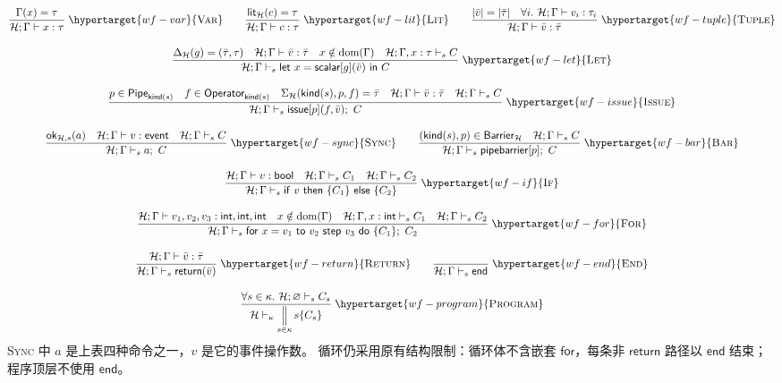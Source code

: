 \documentclass[UTF8,a4paper,11pt,fontset=fandol]{ctexart}
\newcommand{\kw}[1]{\ensuremath{\mathsf{#1}}}
\newcommand{\infer}[2]{\displaystyle\frac{\displaystyle #1}{\displaystyle #2}}
\begin{document}
\begin{equation*}
\begin{gathered}
\infer{\Gamma(x)=\tau}{\mathcal H;\Gamma\vdash x:\tau}\;\hypertarget{wf-var}{\textsc{Var}}
\qquad
\infer{\mathsf{lit}_{\mathcal H}(c)=\tau}{\mathcal H;\Gamma\vdash c:\tau}\;\hypertarget{wf-lit}{\textsc{Lit}}
\qquad
\infer{|\bar v|=|\bar\tau|\quad\forall i.\ \mathcal H;\Gamma\vdash v_i:\tau_i}
 {\mathcal H;\Gamma\vdash\bar v:\bar\tau}\;\hypertarget{wf-tuple}{\textsc{Tuple}}\\[1em]
\infer{\Delta_{\mathcal H}(g)=(\bar\tau,\tau)\quad\mathcal H;\Gamma\vdash\bar v:\bar\tau\quad
 x\notin\mathrm{dom}(\Gamma)\quad\mathcal H;\Gamma,x:\tau\vdash_s C}
 {\mathcal H;\Gamma\vdash_s\kw{let}\ x=\kw{scalar}[g](\bar v)\ \kw{in}\ C}
 \;\hypertarget{wf-let}{\textsc{Let}}\\[1em]
\infer{p\in\mathsf{Pipe}_{\mathsf{kind}(s)}\quad f\in\mathsf{Operator}_{\mathsf{kind}(s)}\quad
 \Sigma_{\mathcal H}(\mathsf{kind}(s),p,f)=\bar\tau\quad\mathcal H;\Gamma\vdash\bar v:\bar\tau\quad\mathcal H;\Gamma\vdash_s C}
 {\mathcal H;\Gamma\vdash_s\kw{issue}[p](f,\bar v);\ C}
 \;\hypertarget{wf-issue}{\textsc{Issue}}\\[1em]
\infer{\mathsf{ok}_{\mathcal H,s}(a)\quad\mathcal H;\Gamma\vdash v:\mathsf{event}\quad\mathcal H;\Gamma\vdash_s C}
 {\mathcal H;\Gamma\vdash_s a;\ C}\;\hypertarget{wf-sync}{\textsc{Sync}}
\qquad
\infer{(\mathsf{kind}(s),p)\in\mathsf{Barrier}_{\mathcal H}\quad\mathcal H;\Gamma\vdash_s C}
 {\mathcal H;\Gamma\vdash_s\kw{pipebarrier}[p];\ C}\;\hypertarget{wf-bar}{\textsc{Bar}}\\[1em]
\infer{\mathcal H;\Gamma\vdash v:\mathsf{bool}\quad\mathcal H;\Gamma\vdash_s C_1\quad\mathcal H;\Gamma\vdash_s C_2}
 {\mathcal H;\Gamma\vdash_s\kw{if}\ v\ \kw{then}\ \{C_1\}\ \kw{else}\ \{C_2\}}
 \;\hypertarget{wf-if}{\textsc{If}}\\[1em]
\infer{\mathcal H;\Gamma\vdash v_1,v_2,v_3:\mathsf{int},\mathsf{int},\mathsf{int}\quad
 x\notin\mathrm{dom}(\Gamma)\quad\mathcal H;\Gamma,x:\mathsf{int}\vdash_s C_1\quad\mathcal H;\Gamma\vdash_s C_2}
 {\mathcal H;\Gamma\vdash_s\kw{for}\ x=v_1\ \kw{to}\ v_2\ \kw{step}\ v_3\ \kw{do}\ \{C_1\};\ C_2}
 \;\hypertarget{wf-for}{\textsc{For}}\\[1em]
\infer{\mathcal H;\Gamma\vdash\bar v:\bar\tau}{\mathcal H;\Gamma\vdash_s\kw{return}(\bar v)}
 \;\hypertarget{wf-return}{\textsc{Return}}
\qquad
\infer{}{\mathcal H;\Gamma\vdash_s\kw{end}}\;\hypertarget{wf-end}{\textsc{End}}\\[1em]
\infer{\forall s\in\kappa.\ \mathcal H;\varnothing\vdash_s C_s}
 {\mathcal H\vdash_\kappa\mathop{\Big\|}_{s\in\kappa}s\{C_s\}}
 \;\hypertarget{wf-program}{\textsc{Program}}
\end{gathered}
\end{equation*}
\noindent \textsc{Sync} 中 $a$ 是上表四种命令之一，$v$ 是它的事件操作数。
循环仍采用原有结构限制：循环体不含嵌套 \kw{for}，每条非 \kw{return} 路径以 \kw{end} 结束；程序顶层不使用 \kw{end}。
\endgroup
\clearpage
\end{document}
